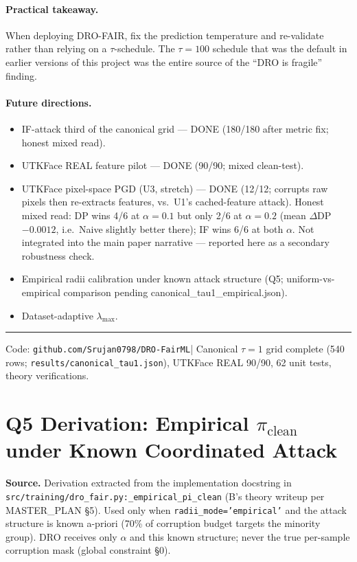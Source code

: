 \documentclass[11pt,a4paper]{article}
\begin{document}
\paragraph{Practical takeaway.}
When deploying DRO-FAIR, fix the prediction temperature and re-validate
rather than relying on a $\tau$-schedule.  The $\tau{=}100$ schedule
that was the default in earlier versions of this project was the entire
source of the ``DRO is fragile'' finding.

\paragraph{Future directions.}
\begin{itemize}
\item IF-attack third of the canonical grid --- DONE (180/180 after metric fix; honest mixed read).
\item UTKFace REAL feature pilot --- DONE (90/90; mixed clean-test).
\item UTKFace pixel-space PGD (U3, stretch) --- DONE (12/12; corrupts raw pixels then re-extracts features, vs.\ U1's cached-feature attack). Honest mixed read: DP wins 4/6 at $\alpha{=}0.1$ but only 2/6 at $\alpha{=}0.2$ (mean $\Delta$DP $-0.0012$, i.e.\ Naive slightly better there); IF wins 6/6 at both $\alpha$. Not integrated into the main paper narrative --- reported here as a secondary robustness check.
\item Empirical radii calibration under known attack structure (Q5; uniform-vs-empirical comparison pending canonical\_tau1\_empirical.json).
\item Dataset-adaptive $\lambda_{\max}$.
\end{itemize}

\vspace{1em}
\hrule
\vspace{0.5em}
{\small
Code: \texttt{github.com/Srujan0798/DRO-FairML}\quad|\quad
Canonical $\tau{=}1$ grid complete (540 rows; \texttt{results/canonical\_tau1.json}), UTKFace REAL 90/90, 62 unit tests, theory verifications.
}

\appendix
\section{Q5 Derivation: Empirical $\pi_{\mathrm{clean}}$ under Known Coordinated Attack}
\label{app:q5}

\textbf{Source.} Derivation extracted from the implementation docstring in
\texttt{src/training/dro\_fair.py:\_empirical\_pi\_clean} (B's theory writeup per
MASTER\_PLAN §5). Used only when \texttt{radii\_mode='empirical'} and the attack
structure is known a-priori (70\% of corruption budget targets the minority group).
DRO receives only $\alpha$ and this known structure; never the true per-sample
corruption mask (global constraint §0).
\end{document}

